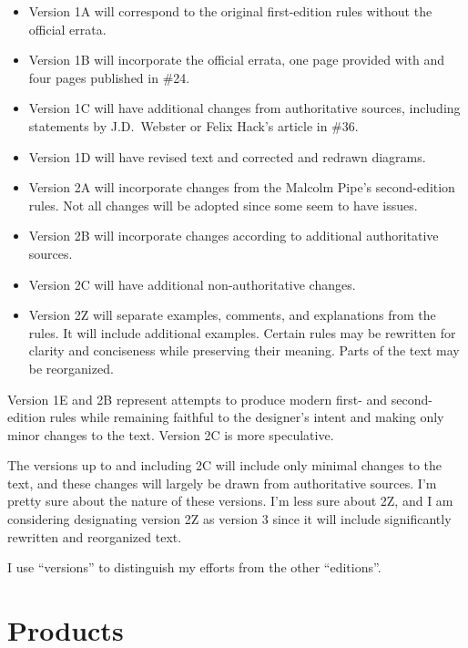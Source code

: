 \documentclass[10pt]{article}
\begin{document}
\begin{itemize}
    \item Version 1A will correspond to the original first-edition rules without the official errata.
    \item Version 1B will incorporate the official errata,  one page provided with {\TSOH} and four pages published in {\APJ} \#24.
    \item Version 1C will have additional changes from authoritative sources, including statements by J.D.\ Webster or Felix Hack’s article in {\APJ} \#36.
    \item Version 1D will have revised text and corrected and redrawn diagrams.
    \item Version 2A will incorporate changes from the Malcolm Pipe’s second-edition rules. Not all changes will be adopted since some seem to have issues.
    \item Version 2B will incorporate changes according to additional authoritative sources.
    \item Version 2C will have additional non-authoritative changes.
    \item Version 2Z will separate examples, comments, and explanations from the rules. It will include additional examples. Certain rules may be rewritten for clarity and conciseness while preserving their meaning. Parts of the text may be reorganized.
\end{itemize}

Version 1E and 2B represent attempts to produce modern first- and second-edition rules while remaining faithful to the designer's intent and making only minor changes to the text. Version 2C is more speculative.

The versions up to and including 2C will include only minimal changes to the text, and these changes will largely be drawn from authoritative sources. I’m pretty sure about the nature of these versions. I’m less sure about 2Z, and I am considering designating version 2Z as version 3 since it will include significantly rewritten and reorganized text.

I use “versions” to distinguish my efforts from the other “editions”.

\section*{Products}
\end{document}
